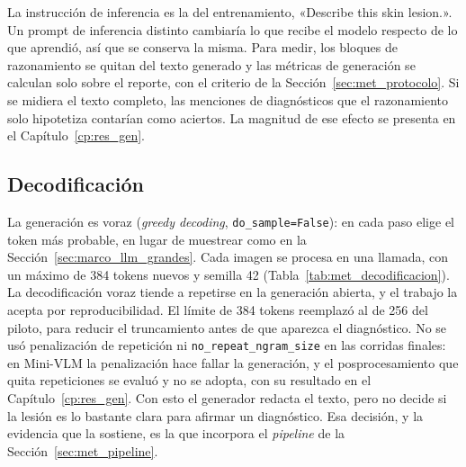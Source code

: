 La instrucción de inferencia es la del entrenamiento, «Describe this skin lesion.». Un prompt de inferencia distinto
cambiaría lo que recibe el modelo respecto de lo que aprendió, así que se conserva la misma. Para medir, los bloques de
razonamiento se quitan del texto generado y las métricas de generación se calculan solo sobre el reporte, con el
criterio de la Sección~\ref{sec:met_protocolo}. Si se midiera el texto completo, las menciones de diagnósticos que el
razonamiento solo hipotetiza contarían como aciertos. La magnitud de ese efecto se presenta en el
Capítulo~\ref{cp:res_gen}.

\subsection{Decodificación}

La generación es voraz (\emph{greedy decoding}, \texttt{do\_sample=False}): en cada paso elige el token más probable, en
lugar de muestrear como en la Sección~\ref{sec:marco_llm_grandes}. Cada imagen se procesa en una llamada, con un máximo
de 384 tokens nuevos y semilla 42 (Tabla~\ref{tab:met_decodificacion}). La decodificación voraz tiende a repetirse en la
generación abierta, y el trabajo la acepta por reproducibilidad. El límite de 384 tokens reemplazó al de 256 del
piloto, para reducir el truncamiento antes de que aparezca el diagnóstico. No se usó
penalización de repetición ni \texttt{no\_repeat\_ngram\_size} en las corridas finales: en Mini-VLM la penalización hace
fallar la generación, y el posprocesamiento que quita repeticiones se evaluó y no se adopta, con su resultado en el
Capítulo~\ref{cp:res_gen}. Con esto el generador redacta el texto, pero no decide si la lesión es lo bastante clara para
afirmar un diagnóstico. Esa decisión, y la evidencia que la sostiene, es la que incorpora el \emph{pipeline} de la
Sección~\ref{sec:met_pipeline}.

